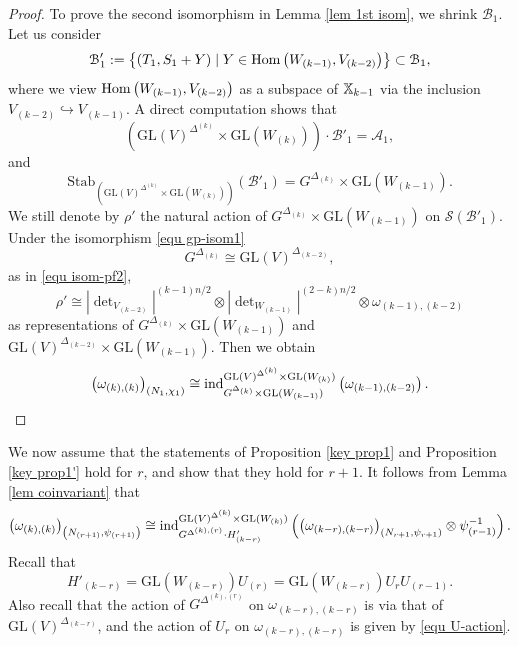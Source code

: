 \documentclass[11pt,reqno]{amsart}
\renewcommand{\1}{{\mathbf{1}}} \newcommand{\sB}{{\mathscr{B}}}
\newcommand{\CA}{{\mathcal {A}}} \newcommand{\CB}{{\mathcal {B}}}
\newcommand{\CS}{{\mathcal {S}}} \newcommand{\CT}{{\mathcal {T}}}
\newcommand{\GL}{{\mathrm{GL}}}\newcommand{\G}{{\mathrm{G}}}
\newcommand{\Stab}{{\mathrm{Stab}}}\newcommand{\Symb}{{\mathrm{Symb}}}
\newcommand{\incl}{\hookrightarrow}
\theoremstyle{plain}
\theoremstyle{definition}
\numberwithin{equation}{section}
\begin{document}
\begin{proof}
To prove the second isomorphism in Lemma \ref{lem 1st isom}, we shrink $\CB_1$. Let us consider
$$\CB_1':=\left\{(T_1,S_1+Y)\mid Y\in\Hom\left(W_{(k-1)},V_{(k-2)}\right)\right\}\subset\CB_1,$$
where we view ${\mathrm{Hom}}\left(W_{(k-1)},V_{(k-2)}\right)$ as a subspace of 
${\mathbb {X}}_{k-1}$ via the inclusion $V_{(k-2)}\incl V_{(k-1)}$. A direct computation shows that 
$$\left(\GL(V)^{\Delta^{(k)}}\times\GL(W_{(k)})\right)\cdot\CB'_1=\CA_1,$$ and
$$\Stab_{ \left(\GL(V)^{\Delta^{(k)}}\times\GL(W_{(k)})\right)}(\CB'_1)=G^{\Delta_{(k)}}\times\GL(W_{(k-1)}).$$
We still denote by $\rho'$ the natural action of $G^{\Delta_{(k)}}\times\GL(W_{(k-1)})$ on  
$\CS(\CB'_1)$.  
Under the  isomorphism \eqref{equ gp-isom1}
$$G^{\Delta_{(k)}}\cong\GL(V)^{\Delta_{(k-2)}},$$ as in \eqref{equ isom-pf2},  $$\rho'\cong|\det\nolimits_{V_{(k-2)}}|^{(k-1)n/2}\otimes|\det\nolimits_{W_{(k-1)}}|^{(2-k)n/2}\otimes\omega_{(k-1),(k-2)}$$
as representations of $G^{\Delta_{(k)}}\times\GL(W_{(k-1)})$ and  $\GL(V)^{\Delta_{(k-2)}}\times\GL(W_{(k-1)})$.
Then we obtain
$$\left(\omega_{(k),(k)}\right)_{\left(N_{1},\chi_1\right)}\cong\ind_{G^{\Delta_{(k)}}\times\GL(W_{(k-1)})}^{\GL(V)^{\Delta^{(k)}}\times\GL(W_{(k)})}\left(\omega_{(k-1),(k-2)}\right).$$
\end{proof}

We now assume that the statements of Proposition \ref{key prop1} and Proposition \ref{key prop1'}  hold for $r$, and show that they hold for $r+1$.
It follows from Lemma \ref{lem coinvariant}  that
$$\left(\omega_{(k),(k)}\right)_{\left(N_{(r+1)},\psi_{(r+1)}\right)}\cong\ind_{G^{\Delta^{(k),(r)}}\cdot H'_{(k-r)}}^{\GL(V)^{\Delta^{(k)}}\times\GL(W_{(k)})}\left(\left(\omega_{(k-r),(k-r)}\right)_{(N_{r+1},\psi_{r+1})}\otimes\psi_{(r-1)}^{-1}\right).$$ Recall that $$H'_{(k-r)}=\GL(W_{(k-r)})U_{(r)}=\GL(W_{(k-r)})U_rU_{(r-1)}.$$ Also recall that the action of
$G^{\Delta^{(k),(r)}}$ on $\omega_{(k-r),(k-r)}$ is via that of $\GL(V)^{\Delta_{(k-r)}}$, and the action of $U_r$ on $\omega_{(k-r),(k-r)}$ is given by \eqref{equ U-action}.
\end{document}
